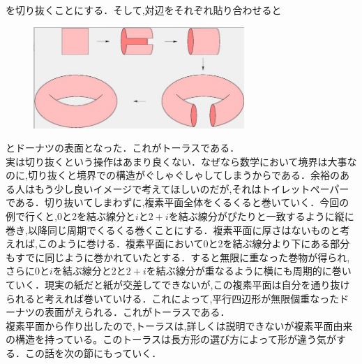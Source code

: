 を切り抜くことにする．そして,対辺をそれぞれ貼り合わせると
\\
\begin{figure}[h]
\includegraphics[width=8cm,bb=0 0 452 217]{asaka3.png}
\end{figure}
とドーナツの表面となった．これがトーラスである．\\
実は切り抜くという操作はあまり良くない．なぜなら数学において境界は大事なのに,切り抜くと境界での構造がぐしゃぐしゃしてしまうからである．余裕のある人はもう少し良いイメージで考えてほしいのだが,それはトイレットペーパーである．切り抜いてしまわずに,複素平面全体をくるくると巻いていく．今回の例で行くと,0と2を結ぶ線分と$i$と$2+i$を結ぶ線分がぴたりと一致するように縦に巻き,以降同じ周期でくるくる巻くことにする．複素平面に厚さはないものと考えれば,このように巻ける．複素平面において0と2を結ぶ線分より下にある部分もすでに同じように巻かれていたとする．すると無限に重なった巻物が得られ,さらに$0$と$i$を結ぶ線分と$2$と$2+i$を結ぶ線分が重なるように横にも周期的に巻いていく．現実の紙だと紙が交差してできないが,この複素平面は自分を通り抜けられると考えれば巻いていける．これによって,平行四辺形が無限個重なったドーナツの表面がえられる．これがトーラスである．\\
複素平面から作り出したので,トーラスは,詳しくは説明できないが複素平面由来の構造を持っている。このトーラスは長方形の選び方によって形が違う気がする．この話を次の節にもっていく．


